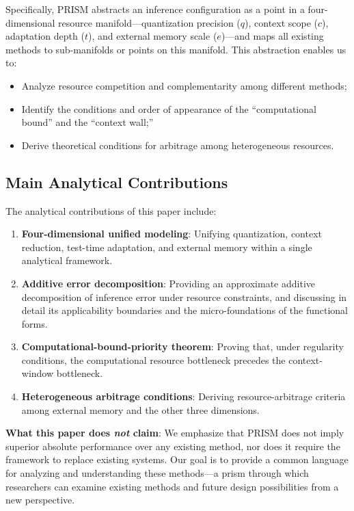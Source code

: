 \documentclass[11pt,a4paper]{article}
\theoremstyle{plain}
\theoremstyle{definition}
\begin{document}
Specifically, PRISM abstracts an inference configuration as a point in a four-dimensional resource manifold---quantization precision ($q$), context scope ($c$), adaptation depth ($t$), and external memory scale ($e$)---and maps all existing methods to sub-manifolds or points on this manifold. This abstraction enables us to:
\begin{itemize}
    \item Analyze resource competition and complementarity among different methods;
    \item Identify the conditions and order of appearance of the ``computational bound'' and the ``context wall;''
    \item Derive theoretical conditions for arbitrage among heterogeneous resources.
\end{itemize}

\subsection{Main Analytical Contributions}

The analytical contributions of this paper include:
\begin{enumerate}
    \item \textbf{Four-dimensional unified modeling}: Unifying quantization, context reduction, test-time adaptation, and external memory within a single analytical framework.
    \item \textbf{Additive error decomposition}: Providing an approximate additive decomposition of inference error under resource constraints, and discussing in detail its applicability boundaries and the micro-foundations of the functional forms.
    \item \textbf{Computational-bound-priority theorem}: Proving that, under regularity conditions, the computational resource bottleneck precedes the context-window bottleneck.
    \item \textbf{Heterogeneous arbitrage conditions}: Deriving resource-arbitrage criteria among external memory and the other three dimensions.
\end{enumerate}

\noindent\textbf{What this paper does \emph{not} claim}: We emphasize that PRISM does not imply superior absolute performance over any existing method, nor does it require the framework to replace existing systems. Our goal is to provide a common language for analyzing and understanding these methods---a prism through which researchers can examine existing methods and future design possibilities from a new perspective.
\end{document}
